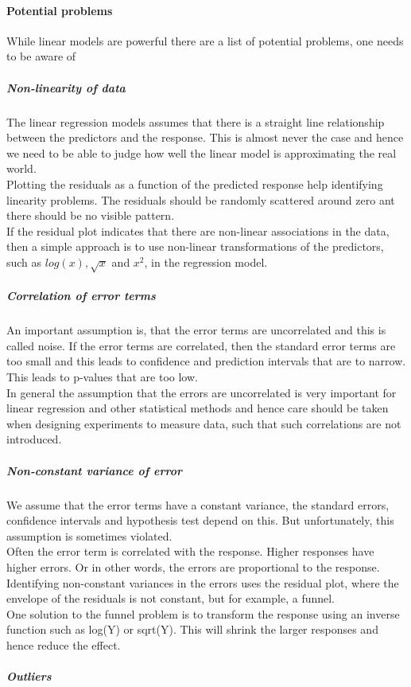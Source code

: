 \documentclass[../document.tex]{subfiles}
\begin{document}
	\paragraph{Potential problems}
	While linear models are powerful there are a list of potential problems, one needs to be aware of
	\subparagraph{Non-linearity of data}
	The linear regression models assumes that there is a straight line relationship between the predictors and the response. This is almost never the case and hence we need to be able to judge how well the linear model is approximating the real world.\\
	Plotting the residuals as a function of the predicted response help identifying linearity problems. The residuals should be randomly scattered around zero ant there should be no visible pattern.\\
	If the residual plot indicates that there are non-linear associations in the data, then a simple approach is to use non-linear transformations of the predictors, such as \(log(x), \sqrt{x}\) and \(x^2\), in the regression model.
	\subparagraph{Correlation of error terms}
	An important assumption is, that the error terms are uncorrelated and this is called noise. If the error terms are correlated, then the standard error terms are too small and this leads to confidence and prediction intervals that are to narrow. This leads to p-values that are too low.\\
	In general the assumption that the errors are uncorrelated is very important for linear regression and other statistical methods and hence care should be taken when designing experiments to measure data, such that such correlations are not introduced.
	\subparagraph{Non-constant variance of error}
	We assume that the error terms have a constant variance, the standard errors, confidence intervals and hypothesis test depend on this. But unfortunately, this assumption is sometimes violated.\\
	Often the error term is correlated with the response. Higher responses have higher errors. Or in other words, the errors are proportional to the response.\\
	Identifying non-constant variances in the errors uses the residual plot, where the envelope of the residuals is not constant, but for example, a funnel.\\
	One solution to the funnel problem is to transform the response using an inverse function such as log(Y) or sqrt(Y). This will shrink the larger responses and hence reduce the effect.
	\subparagraph{Outliers}
\end{document}
